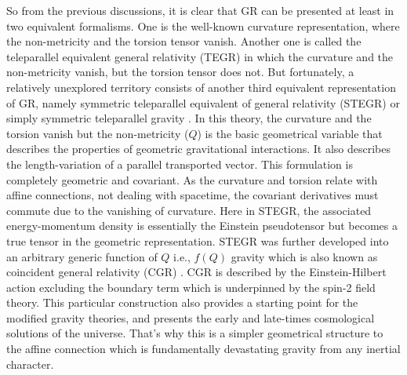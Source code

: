 \documentclass[showpacs,aps,amssymb,preprintnumbers,prd,amsmath,floatfix]{revtex4}
\begin{document}
So from the previous discussions, it is clear that GR can be presented at least in two equivalent formalisms. One is the well-known curvature representation, where the non-metricity and the torsion tensor vanish. Another one is called the teleparallel equivalent general relativity (TEGR) in which the curvature and the non-metricity vanish, but the torsion tensor does not. But fortunately, a relatively unexplored territory consists of another third equivalent representation of GR, namely symmetric teleparallel equivalent of general relativity (STEGR) or simply symmetric teleparallel gravity \cite{Nester}. In this theory, the curvature and the torsion vanish but the non-metricity ($Q$) is the basic geometrical variable that describes the properties of geometric gravitational interactions. It also describes the length-variation of a parallel transported vector. This formulation is completely geometric and covariant. As the curvature and torsion relate with affine connections, not dealing with spacetime, the covariant derivatives must commute due to the vanishing of curvature. Here in STEGR, the associated energy-momentum density is essentially the Einstein pseudotensor but becomes a true tensor in the geometric representation. STEGR was further developed into an arbitrary generic function of $Q$ i.e., $f(Q)$ gravity which is also known as coincident general relativity (CGR) \cite{Lavinia}. CGR is described by the Einstein-Hilbert action excluding the boundary term which is underpinned by the spin-2 field theory. This particular construction also provides a starting
point for the modified gravity theories, and presents the early and late-times cosmological solutions of the universe. That's why this is a simpler geometrical structure to the affine connection which is fundamentally devastating gravity from any inertial character.
\end{document}
